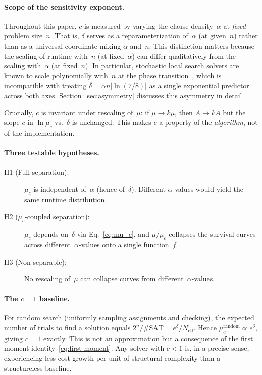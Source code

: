 \documentclass[11pt,a4paper]{article}
\newcommand{\mc}{\mu_c}
\newcommand{\Neff}{N_{\text{eff}}}
\begin{document}
\paragraph{Scope of the sensitivity exponent.}
Throughout this paper, $c$ is measured by varying
the clause density~$\alpha$ at \emph{fixed} problem size~$n$.
That is, $\delta$ serves as a reparameterization of~$\alpha$
(at given~$n$) rather than as a universal coordinate mixing
$\alpha$ and~$n$.
This distinction matters because the scaling of runtime
with~$n$ (at fixed~$\alpha$) can differ qualitatively from
the scaling with~$\alpha$ (at fixed~$n$).
In particular, stochastic local search solvers are known
to scale polynomially with~$n$ at the
phase transition~\cite{MuHoos2015},
which is incompatible with treating $\delta = \alpha n|\!\ln(7/8)|$
as a single exponential predictor across both axes.
Section~\ref{sec:asymmetry} discusses this asymmetry in detail.

Crucially, $c$ is invariant under rescaling of~$\mu$:
if $\mu \to k\mu$, then $A \to kA$ but the slope $c$ in
$\ln \mc$ vs.\ $\delta$ is unchanged.
This makes $c$ a property of the \emph{algorithm}, not of
the implementation.

\paragraph{Three testable hypotheses.}
\begin{description}
\item[H1 (Full separation):] $\mc$ is independent of~$\alpha$
  (hence of~$\delta$).
  Different $\alpha$-values would yield the same
  runtime distribution.
\item[H2 ($\mc$-coupled separation):]
  $\mc$ depends on~$\delta$ via Eq.~\eqref{eq:mu_c},
  and $\mu/\mc$ collapses the survival curves across
  different~$\alpha$-values onto a single function~$f$.
\item[H3 (Non-separable):]
  No rescaling of~$\mu$ can collapse curves from
  different~$\alpha$-values.
\end{description}

\paragraph{The $c = 1$ baseline.}
For random search (uniformly sampling assignments and checking),
the expected number of trials to find a solution equals
$2^n / \#\text{SAT} = e^{\delta} / \Neff$.
Hence $\mc^{\text{random}} \propto e^{\delta}$, giving $c = 1$
exactly.
This is not an approximation but a consequence of the first
moment identity~\eqref{eq:first-moment}.
Any solver with $c < 1$ is, in a precise sense, experiencing
less cost growth per unit of structural complexity than
a structureless baseline.
\end{document}
